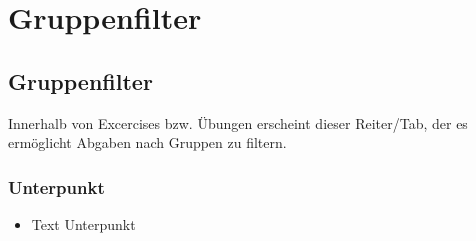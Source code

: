 \chapter{Gruppenfilter}\label{gruppenfilter}
\minitoc
\clearpage
\section{Gruppenfilter}
Innerhalb von Excercises bzw. Übungen erscheint dieser Reiter/Tab, der es ermöglicht Abgaben nach Gruppen zu filtern. 

\subsection*{Unterpunkt}
\begin{itemize}
	\item Text Unterpunkt
\end{itemize}

\clearpage